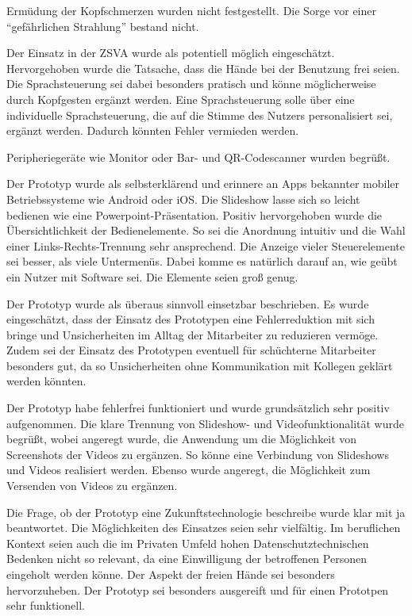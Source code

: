 Ermüdung der Kopfschmerzen wurden nicht festgestellt. Die Sorge vor einer \enquote{gefährlichen Strahlung} bestand nicht.

Der Einsatz in der ZSVA wurde als potentiell möglich eingeschätzt. Hervorgehoben wurde die Tatsache, dass die Hände bei der Benutzung frei seien. Die Sprachsteuerung sei dabei besonders pratisch und könne möglicherweise durch Kopfgesten ergänzt werden. Eine Sprachsteuerung solle über eine individuelle Sprachsteuerung, die auf die Stimme des Nutzers personalisiert sei, ergänzt werden. Dadurch könnten Fehler vermieden werden.

Peripheriegeräte wie Monitor oder Bar- und QR-Codescanner wurden begrüßt.

Der Prototyp wurde als selbsterklärend und erinnere an Apps bekannter mobiler  Betriebssysteme wie Android oder iOS. Die Slideshow lasse sich so leicht bedienen wie eine Powerpoint-Präsentation. Positiv hervorgehoben wurde die Übersichtlichkeit der Bedienelemente. So sei die Anordnung intuitiv und die Wahl einer Links-Rechts-Trennung sehr ansprechend. Die Anzeige vieler Steuerelemente sei besser, als viele Untermenüs. Dabei komme es natürlich darauf an, wie geübt ein Nutzer mit Software sei. Die Elemente seien groß genug. 

Der Prototyp wurde als überaus sinnvoll einsetzbar beschrieben. Es wurde eingeschätzt, dass der Einsatz des Prototypen eine Fehlerreduktion mit sich bringe und Unsicherheiten im Alltag der Mitarbeiter zu reduzieren vermöge. Zudem sei der Einsatz des Prototypen eventuell für schüchterne Mitarbeiter besonders gut, da so Unsicherheiten ohne Kommunikation mit Kollegen geklärt werden könnten.

Der Prototyp habe fehlerfrei funktioniert und wurde grundsätzlich sehr positiv aufgenommen. Die klare Trennung von Slideshow- und Videofunktionalität wurde begrüßt, wobei angeregt wurde, die Anwendung um die Möglichkeit von Screenshots der Videos zu ergänzen. So könne eine Verbindung von Slideshows und Videos realisiert werden. Ebenso wurde angeregt, die Möglichkeit zum Versenden von Videos zu ergänzen.

Die Frage, ob der Prototyp eine Zukunftstechnologie beschreibe wurde klar mit ja beantwortet. Die Möglichkeiten des Einsatzes seien sehr vielfältig. Im beruflichen Kontext seien auch die im Privaten Umfeld hohen Datenschutztechnischen Bedenken nicht so relevant, da eine Einwilligung der betroffenen Personen eingeholt werden könne. Der Aspekt der freien Hände sei besonders hervorzuheben. Der Prototyp sei besonders ausgereift und für einen Prototpen sehr funktionell.

